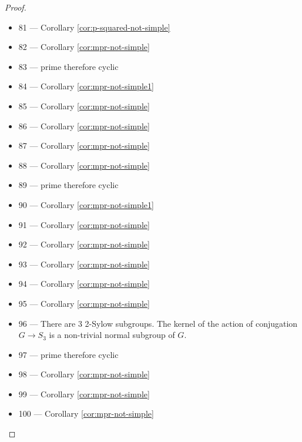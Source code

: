 \begin{proof}
\begin{itemize}
\begin{proof}
	\pf
	\begin{proof}
		\pf\ Otherwise $\im \gamma$ would be a subgroup of $S_5$ of order 80, contradicting Lagrange's Theorem.
	\end{proof}
	\qedstep
	\begin{proof}
		\pf\ This is a contradiction.
	\end{proof}
\end{proof}

\item 81 --- Corollary \ref{cor:p-squared-not-simple}
\item 82 --- Corollary \ref{cor:mpr-not-simple}
\item 83 --- prime therefore cyclic
\item 84 --- Corollary \ref{cor:mpr-not-simple1}
\item 85 --- Corollary \ref{cor:mpr-not-simple}
\item 86 --- Corollary \ref{cor:mpr-not-simple}
\item 87 --- Corollary \ref{cor:mpr-not-simple}
\item 88 --- Corollary \ref{cor:mpr-not-simple}
\item 89 --- prime therefore cyclic
\item 90 --- Corollary \ref{cor:mpr-not-simple1}
\item 91 --- Corollary \ref{cor:mpr-not-simple}
\item 92 --- Corollary \ref{cor:mpr-not-simple}
\item 93 --- Corollary \ref{cor:mpr-not-simple}
\item 94 --- Corollary \ref{cor:mpr-not-simple}
\item 95 --- Corollary \ref{cor:mpr-not-simple}
\item 96 --- There are 3 2-Sylow subgroups. The kernel of the action of conjugation $G \rightarrow S_3$ is a non-trivial normal subgroup of $G$.
\item 97 --- prime therefore cyclic
\item 98 --- Corollary \ref{cor:mpr-not-simple}
\item 99 --- Corollary \ref{cor:mpr-not-simple}
\item 100 --- Corollary \ref{cor:mpr-not-simple}

\end{itemize}
\end{proof}
